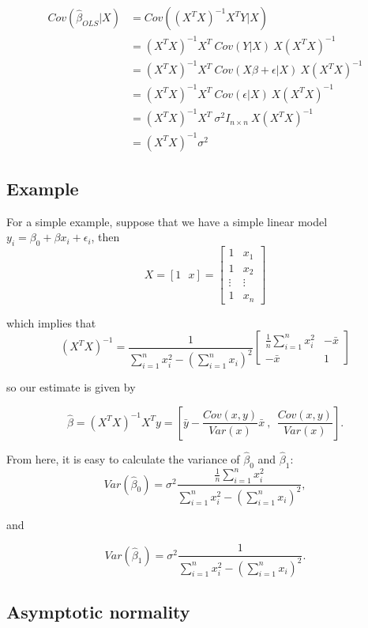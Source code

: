 \begin{align*}
Cov\left( \hat{\beta}_{OLS} \Big| X \right) & = Cov\left( (X^TX)^{-1}X^TY \Big| X \right)\\
& = (X^TX)^{-1}X^T ~Cov(Y | X)~ X(X^TX)^{-1}\\
& = (X^TX)^{-1}X^T ~Cov(X\beta + \epsilon | X)~ X(X^TX)^{-1}\\
& = (X^TX)^{-1}X^T ~Cov(\epsilon | X)~ X(X^TX)^{-1}\\
& = (X^TX)^{-1}X^T~\sigma^2 I_{n \times n}~X(X^TX)^{-1}\\
& = (X^TX)^{-1}\sigma^2
\end{align*}


\subsection*{Example}
For a simple example, suppose that we have a simple linear model $y_i = \beta_0 + \beta x_i + \epsilon_i$, then 
$$X = [1 ~~~ x] = \left[ \begin{array}{cc} 1 & x_1\\ 1 & x_2 \\ \vdots & \vdots \\ 1 & x_n \end{array}\right]$$

which implies that 
$$(X^TX)^{-1} = \frac{1}{\sum_{i=1}^n x_i^2 - \left( \sum_{i=1}^n x_i\right)^2}\left[ \begin{array}{cc} \frac{1}{n} \sum_{i=1}^n x_i^2 & - \bar{x}\\ - \bar{x} & 1 \end{array} \right]$$

so our estimate is given by

$$\hat{\beta} = (X^TX)^{-1}X^Ty = \left[\bar{y} - \frac{Cov(x, y)}{Var(x)} \bar{x}~,~~ \frac{Cov(x, y)}{Var(x)} \right].$$


From here, it is easy to calculate the variance of $\hat{\beta}_0$ and $\hat{\beta}_1$:
$$Var(\hat{\beta}_0) = \sigma^2\frac{\frac{1}{n} \sum_{i=1}^n x_i^2}{\sum_{i=1}^n x_i^2 - \left( \sum_{i=1}^n x_i\right)^2},$$

and

$$Var(\hat{\beta}_1) = \sigma^2\frac{1}{\sum_{i=1}^n x_i^2 - \left( \sum_{i=1}^n x_i\right)^2}.$$



\subsection*{Asymptotic normality}

